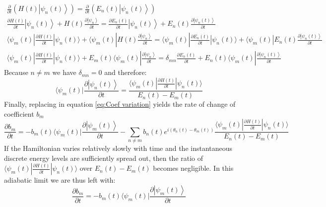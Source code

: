 \documentclass[11pt,a4paper]{article}
\begin{document}
\begin{equation*}
	\begin{gathered}
		\frac{\partial}{\partial t} \left( H(t) \left|\psi_n(t)\right\rangle \right) = \frac{\partial}{\partial t} \left( E_n(t) \left|\psi_n(t)\right\rangle \right) \\[6pt]
		\frac{\partial H(t)}{\partial t} \left|\psi_n(t)\right\rangle + H(t) \frac{\partial \left|\psi_n\right\rangle}{\partial t} = \frac{\partial E_n(t)}{\partial t} \left|\psi_n(t)\right\rangle + E_n(t) \frac{\partial \left|\psi_n(t)\right\rangle}{\partial t} \\[6pt]
		\langle \psi_m(t) | \frac{\partial H(t)}{\partial t} | \psi_n(t) \rangle + \langle \psi_m(t) | H(t) \frac{\partial \left|\psi_n\right\rangle}{\partial t} = \langle \psi_m(t) | \frac{\partial E_n(t)}{\partial t} | \psi_n(t) \rangle + \langle \psi_m(t) | E_n(t) \frac{\partial \left|\psi_n(t)\right\rangle}{\partial t} \\[6pt]
		\langle \psi_m(t) | \frac{\partial H(t)}{\partial t} | \psi_n(t) \rangle + E_m(t) \langle \psi_m(t) | \frac{\partial \left|\psi_n\right\rangle}{\partial t} = \delta_{mn} \frac{\partial E_n(t)}{\partial t} + E_n(t) \langle \psi_m(t) | \frac{\partial \left|\psi_n(t)\right\rangle}{\partial t}
	\end{gathered}
\end{equation*}
Because $n\neq m$ we have $\delta_{mn}=0$ and therefore:
\begin{equation*}
	\langle \psi_m(t) | \frac{\partial \left|\psi_n(t)\right\rangle}{\partial t} = \frac{\langle \psi_m(t) | \frac{\partial H(t)}{\partial t} | \psi_n(t) \rangle}{E_n(t) - E_m(t)}
\end{equation*}
Finally, replacing in equation \eqref{eq:Coef variation} yields the rate of change of coefficient $b_m$
\begin{equation*}
	\frac{\partial b_m}{\partial t} = -b_m(t) \langle \psi_m(t) | \frac{\partial \left|\psi_m(t)\right\rangle}{\partial t} - \sum_{n \neq m} b_n(t) e^{i(\theta_n(t) - \theta_m(t))} \frac{\langle \psi_m(t) | \frac{\partial H(t)}{\partial t} | \psi_n(t) \rangle}{E_n(t) - E_m(t)}
\end{equation*}
If the Hamiltonian varies relatively slowly with time and the instantaneous discrete energy levels are sufficiently spread out, then the ratio of $\langle \psi_m(t) | \frac{\partial H(t)}{\partial t} | \psi_n(t) \rangle$ over $E_n(t) - E_m(t)$ becomes negligible. In this adiabatic limit we are thus left with:
\begin{equation*}
	\frac{\partial b_m}{\partial t} = -b_m(t) \langle \psi_m(t) | \frac{\partial \left|\psi_m(t)\right\rangle}{\partial t}
\end{equation*}
\end{document}
